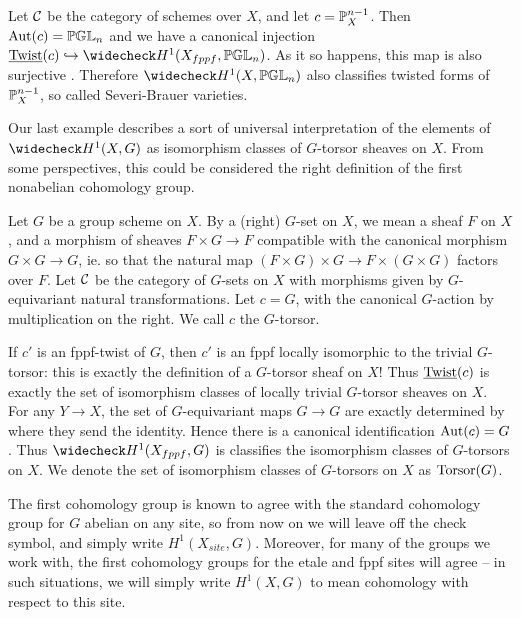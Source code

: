 \begin{ex}
Let $\mathcal{C}$ be the category of schemes over $X$, and let $c = \mathbb{P}^{n-1}_X$.  Then $\textnormal{Aut}(c) = \mathbb{PGL}_n$ and we have a canonical injection $\twist(c)\hookrightarrow \wc{H}^1(X_{fppf},\bbpgl_n)$.  As it so happens, this map is also surjective \cite{milne1980etale}.  Therefore $\wc{H}^1(X,\bbpgl_n)$ also classifies twisted forms of $\mathbb{P}^{n-1}_X$, so called Severi-Brauer varieties.
\end{ex}

Our last example describes a sort of universal interpretation of the elements of $\wc{H}^1(X,G)$ as isomorphism classes of $G$-torsor sheaves on $X$.  From some perspectives, this could be considered the right definition of the first nonabelian cohomology group.
\begin{ex}
Let $G$ be a group scheme on $X$.  By a (right) $G$-set on $X$, we mean a sheaf $F$ on $X$, and a morphism of sheaves $F\times G\rightarrow F$ compatible with the canonical morphism $G\times G\rightarrow G$, ie. so that the natural map $(F\times G)\times G\rightarrow F\times (G\times G)$ factors over $F$.  Let $\mathcal{C}$ be the category of $G$-sets on $X$ with morphisms given by $G$-equivariant natural transformations.  Let $c=G$, with the canonical $G$-action by multiplication on the right.  We call $c$ the  $G$-torsor.

If $c'$ is an fppf-twist of $G$, then $c'$ is an fppf locally isomorphic to the trivial $G$-torsor: this is exactly the definition of a $G$-torsor sheaf on $X$!  Thus $\textnormal{\underline{Twist}}(c)$ is exactly the set of isomorphism classes of locally trivial $G$-torsor sheaves on $X$.  For any $Y\rightarrow X$, the set of $G$-equivariant maps $G\rightarrow G$ are exactly determined by where they send the identity.  Hence there is a canonical identification $\textnormal{Aut}(c) = G$.  Thus $\wc H^1(X_{fppf},G)$ is classifies the isomorphism classes of $G$-torsors on $X$.  We denote the set of isomorphism classes of $G$-torsors on $X$ as $\textnormal{Torsor}(G)$.
\end{ex}

\begin{remk}
The first cohomology group is known to agree with the standard cohomology group for $G$ abelian on any site, so from now on we will leave off the check symbol, and simply write $H^1(X_{site},G)$.  Moreover, for many of the groups we work with, the first cohomology groups for the etale and fppf sites will agree -- in such situations, we will simply write $H^1(X,G)$ to mean cohomology with respect to this site.
\end{remk}

